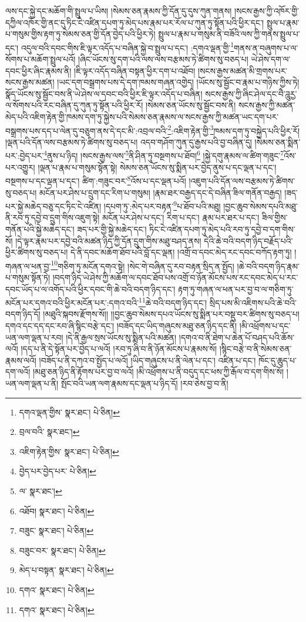 ལས་དང་སྐྱེ་དང་མཆོག་གི་སྤྲུལ་པ་ཡིས། །སེམས་ཅན་རྣམས་ཀྱི་དོན་དུ་དུས་ཀུན་གནས། །སངས་རྒྱས་ཀྱི་འཁོར་གྱི་དཀྱིལ་འཁོར་གྱི་ནང་དུ་ཏིང་ངེ་འཛིན་དཔག་ཏུ་མེད་པས་རྣམ་པར་རོལ་པ་ཀུན་ཏུ་སྟོན་པའི་ཕྱིར་དང་། སྤྲུལ་པ་རྣམ་པ་གསུམ་གྱིས་རྟག་ཏུ་སེམས་ཅན་གྱི་དོན་བྱེད་པའི་ཕྱིར་ཏེ། སྤྲུལ་པ་རྣམ་པ་གསུམ་ནི་བཟོའི་ལས་ཀྱི་གནས་སྤྲུལ་པ་དང་། འདུལ་བའི་དབང་གིས་ཇི་ལྟར་འདོད་པ་བཞིན་སྐྱེ་བ་སྤྲུལ་པ་དང་། :དགའ་ལྡན་གྱི་\footnote{དགའ་ལྡན་གྱིས་  སྣར་ཐང་།  པེ་ཅིན། }གནས་ན་བཞུགས་པ་ལ་སོགས་པ་མཆོག་སྤྲུལ་པའོ། །ཞིང་ཡོངས་སུ་དག་པའི་ལས་ལས་བརྩམས་ཏེ་ཚིགས་སུ་བཅད་པ། ཡེ་ཤེས་དག་ལ་དབང་ཕྱིར་ཞིང་རྣམས་ནི། །ཇི་ལྟར་འདོད་བཞིན་བསྟན་ཕྱིར་དག་པ་འཐོབ། །སངས་རྒྱས་མཚན་མི་གྲགས་པར་སངས་རྒྱས་མཚན། །ཡང་དག་བསྒྲགས་པས་དེ་དག་ཁམས་གཞན་འགྱེད། །ཡོངས་སུ་སྦྱོང་བ་རྣམ་པ་གཉིས་ཀྱིས་ཏེ། སྣོད་ཡོངས་སུ་སྦྱོང་བས་ནི་ཡེ་ཤེས་ལ་དབང་བའི་ཕྱིར་ཇི་ལྟར་འདོད་པ་བཞིན། སངས་རྒྱས་ཀྱི་ཞིང་ཤེལ་དང་བཻ་ཌཱུརྱ་ལ་སོགས་པའི་རང་བཞིན་དུ་ཀུན་ཏུ་སྟོན་པའི་ཕྱིར་རོ། །སེམས་ཅན་ཡོངས་སུ་སྦྱོང་བས་ནི། སངས་རྒྱས་ཀྱི་མཚན་མེད་པའི་འཇིག་རྟེན་གྱི་ཁམས་དག་ཏུ་སྐྱེས་པའི་སེམས་ཅན་རྣམས་ལ་སངས་རྒྱས་ཀྱི་མཚན་ཡང་དག་པར་བསྒྲགས་པས་དད་པ་ལེན་དུ་བཅུག་ནས་དེ་དང་མི་:འབྲལ་བའི་\footnote{བྲལ་བའི་  སྣར་ཐང་། }:འཇིག་རྟེན་གྱི་\footnote{འཇིག་རྟེན་གྱིས་  སྣར་ཐང་།  པེ་ཅིན། }ཁམས་དག་ཏུ་བསྐྱེད་པའི་ཕྱིར་རོ། །ལྡན་པའི་དོན་ལས་བརྩམས་ཏེ་ཚིགས་སུ་བཅད་པ། འདབ་གཤོག་ཀུན་དུ་རྒྱས་པའི་བྱ་བཞིན་དུ། །སེམས་ཅན་སྨིན་པར་:བྱེད་པར་\footnote{བྱེད་པར་བྱེད་པར་  པེ་ཅིན། }ནུས་པ་ཉིད། །སངས་རྒྱས་ལས་\footnote{ལ་  སྣར་ཐང་། }ནི་ཤིན་ཏུ་བསྔགས་པ་ཐོབ།\footnote{འཐོབ།  སྣར་ཐང་།  པེ་ཅིན། } །སྐྱེ་དགུ་རྣམས་ལ་ཚིག་གཟུང་\footnote{བཟུང་  སྣར་ཐང་།  པེ་ཅིན། }འོས་པར་འགྱུར། །ལྡན་པ་རྣམ་པ་གསུམ་སྟོན་སྟེ། སེམས་ཅན་ཡོངས་སུ་སྨིན་པར་བྱེད་ནུས་པ་དང་ལྡན་པ་དང་། བསྔགས་པ་དང་ལྡན་པ་དང་། ཚིག་:གཟུང་བར་\footnote{བཟུང་བར་  སྣར་ཐང་།  པེ་ཅིན། }འོས་པ་དང་ལྡན་པའོ། །འཇུག་པའི་དོན་ལས་བརྩམས་ཏེ་ཚིགས་སུ་བཅད་པ། མངོན་པར་ཤེས་པ་དྲུག་དང་རིག་པ་གསུམ། །རྣམ་ཐར་བརྒྱད་དང་དེ་བཞིན་ཟིལ་གནོན་བརྒྱད། །ཟད་པར་སྐྱེ་མཆེད་བཅུ་དང་ཏིང་ངེ་འཛིན། །དཔག་ཏུ་:མེད་པར་བརྟན་\footnote{མེད་པ་བསྟན་  སྣར་ཐང་།  པེ་ཅིན། }པ་ཐོབ་པའི་མཐུ། །བྱང་ཆུབ་སེམས་དཔའི་མཐུ་ནི་རབ་ཏུ་དབྱེ་བ་དྲུག་གིས་འཇུག་སྟེ། མངོན་པར་ཤེས་པ་དང་། རིག་པ་དང་། རྣམ་པར་ཐར་པ་དང་། ཟིལ་གྱིས་གནོན་པའི་སྐྱེ་མཆེད་དང་། ཟད་པར་གྱི་སྐྱེ་མཆེད་དང་། ཏིང་ངེ་འཛིན་དཔག་ཏུ་མེད་པའི་རབ་ཏུ་དབྱེ་བ་དག་གིས་སོ། །དེ་ལྟར་རྣམ་པར་དབྱེ་བའི་མཚན་ཉིད་ཀྱི་དོན་དྲུག་གིས་མཐུ་བཤད་ནས། དེའི་ཆེ་བའི་བདག་ཉིད་བརྗོད་པའི་ཕྱིར་ཚིགས་སུ་བཅད་པ། དེ་ནི་དབང་མཆོག་ཐོབ་པའི་བློ་དང་ལྡན། །འགྲོ་བ་དབང་མེད་རང་དབང་བཀོད་རྟག་ཏུ། །གཞན་ལ་ཕན་བྱ་\footnote{དགའ་  སྣར་ཐང་།  པེ་ཅིན། }གཅིག་ཏུ་མངོན་དགའ་སྟེ། །སེང་གེ་བཞིན་དུ་རབ་བརྟན་སྲིད་ན་སྤྱོད། །ཆེ་བའི་བདག་ཉིད་རྣམ་པ་གསུམ་སྟོན་ཏེ། །བདག་ཉིད་ཡེ་ཤེས་ཀྱི་མཆོག་ལ་དབང་ཐོབ་པས་འགྲོ་བ་ཉོན་མོངས་པས་རང་དབང་མེད་པ་རང་དབང་ཡོད་པ་ལ་འགོད་པའི་ཕྱིར་དབང་གི་ཆེ་བའི་བདག་ཉིད་དང་། རྟག་ཏུ་གཞན་ལ་ཕན་པར་བྱ་བ་ལ་གཅིག་ཏུ་མངོན་པར་དགའ་བའི་ཕྱིར་མངོན་པར་:དགའ་བའི་\footnote{དགའ་  སྣར་ཐང་།  པེ་ཅིན། }ཆེ་བའི་བདག་ཉིད་དང་། སྲིད་པས་མི་འཇིགས་པའི་ཆེ་བའི་བདག་ཉིད་དོ། །མཐུའི་སྐབས་རྫོགས་སོ།། །།བྱང་ཆུབ་སེམས་དཔའ་ཡོངས་སུ་སྨིན་པར་བསྡུ་བར་ཚིགས་སུ་བཅད་པ། དགའ་དང་དད་དང་རབ་ཞི་སྙིང་བརྩེ་དང་། །བཟོད་དང་ཡིད་གཞུངས་མཐུ་ཅན་ཉིད་དང་ནི། །མི་འཕྲོགས་པ་དང་ཡན་ལག་ལྡན་པ་རབ། །དེ་ནི་རྒྱལ་སྲས་ཡོངས་སུ་སྨིན་པའི་མཚན། །དགའ་བ་ནི་ཐེག་པ་ཆེན་པོ་བཤད་པའི་ཆོས་ལའོ། །དད་པ་ནི་དེ་སྟོན་པར་བྱེད་པ་ལའོ། །རབ་ཏུ་ཞི་བ་ནི་ཉོན་མོངས་པ་རྣམས་སོ། །སྙིང་བརྩེ་བ་ནི་སེམས་ཅན་རྣམས་ལའོ། །བཟོད་པ་ནི་དཀའ་བ་སྤྱོད་པ་ལའོ། །ཡིད་གཞུངས་པ་ནི་ལེན་པ་དང་། འཛིན་པ་དང་། ཁོང་དུ་ཆུད་པ་དག་ལའོ། །མཐུ་ཅན་ཉིད་ནི་རྟོགས་པར་བྱ་བ་ལའོ། །མི་འཕྲོགས་པ་ནི་བདུད་དང་ཕས་ཀྱི་རྒོལ་བ་དག་གིས་སོ། །ཡན་ལག་ལྡན་པ་ནི། སྤོང་བའི་ཡན་ལག་རྣམས་དང་ལྡན་པ་ཉིད་དོ། །རབ་ཅེས་བྱ་བ་ནི། 